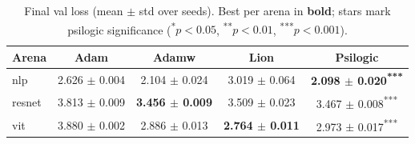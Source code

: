 \begin{table}[t]
\centering
\caption{Final val loss (mean $\pm$ std over seeds). Best per arena in \textbf{bold}; stars mark psilogic significance (\textsuperscript{*}$p<0.05$, \textsuperscript{**}$p<0.01$, \textsuperscript{***}$p<0.001$).}
\label{tab:val_loss}
\begin{tabular}{lcccc}
\toprule
Arena & Adam & Adamw & Lion & Psilogic \\
\midrule
nlp & 2.626 $\pm$ 0.004 & 2.104 $\pm$ 0.024 & 3.019 $\pm$ 0.064 & \textbf{2.098 $\pm$ 0.020\textsuperscript{***}} \\
resnet & 3.813 $\pm$ 0.009 & \textbf{3.456 $\pm$ 0.009} & 3.509 $\pm$ 0.023 & 3.467 $\pm$ 0.008\textsuperscript{***} \\
vit & 3.880 $\pm$ 0.002 & 2.886 $\pm$ 0.013 & \textbf{2.764 $\pm$ 0.011} & 2.973 $\pm$ 0.017\textsuperscript{***} \\
\bottomrule
\end{tabular}
\end{table}
